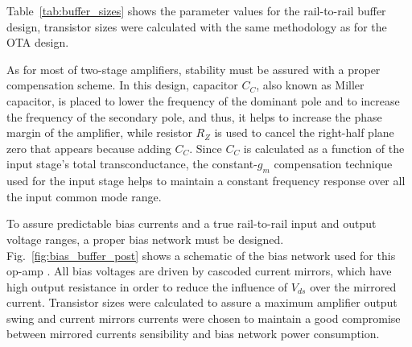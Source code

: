 Table~\ref{tab:buffer_sizes} shows the parameter values for the rail-to-rail buffer design, transistor sizes were calculated with the same methodology as for the OTA design.

As for most of two-stage amplifiers, stability must be assured with a proper compensation scheme. In this design, capacitor $C_C$, also known as Miller capacitor, is placed to lower the frequency of the dominant pole and to increase the frequency of the secondary pole, and thus, it helps to increase the phase margin of the amplifier, while resistor $R_Z$ is used to cancel the right-half plane zero that appears because adding $C_C$. Since $C_C$ is calculated as a function of the input stage's total transconductance, the constant-$g_m$ compensation technique used for the input stage helps to maintain a constant frequency response over all the input common mode range.

To assure predictable bias currents and a true rail-to-rail input and output voltage ranges, a proper bias network must be designed. Fig.~\ref{fig:bias_buffer_post} shows a schematic of the bias network used for this op-amp \citep{baker101}. All bias voltages are driven by cascoded current mirrors, which have high output resistance in order to reduce the influence of $V_{ds}$ over the mirrored current. Transistor sizes were calculated to assure  a maximum amplifier output swing and current mirrors currents were chosen to maintain a good compromise between mirrored currents sensibility and bias network power consumption. 

